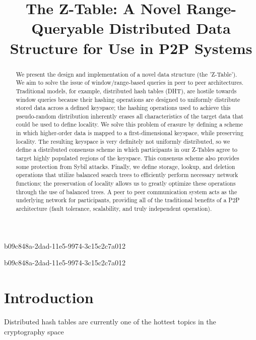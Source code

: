 \documentclass[12pt]{article}
\title{The Z-Table: A Novel Range-Queryable Distributed Data Structure for Use in P2P Systems}
\begin{document}
b09c848a-2dad-11e5-9974-3c15c2c7a012
\maketitle

\begin{abstract}
We present the design and implementation of a novel data structure (the 'Z-Table'). We aim to solve the issue of window/range-based queries in peer to peer architectures. Traditional models, for example,  distributed hash tables (DHT), are hostile towards window queries because their hashing operations are designed to uniformly distribute stored data across a defined keyspace; the hashing operations used to achieve this pseudo-random distribution inherently erases all characteristics of the target data that could be used to define locality. We solve this problem of erasure by defining a scheme in which higher-order data is mapped to a first-dimensional keyspace, while preserving locality. The resulting keyspace is very definitely not uniformly distributed, so we define a distributed consensus scheme in which participants in our Z-Tables agree to target highly populated regions of the keyspace. This consensus scheme also provides some protection from Sybil attacks. Finally, we define storage, lookup, and deletion operations that utilize balanced search trees to efficiently perform necessary network functions; the preservation of locality allows us to greatly optimize these operations through the use of balanced trees. A peer to peer communication system acts as the underlying network for participants, providing all of the traditional benefits of a P2P architecture (fault tolerance, scalability, and truly independent operation).
\end{abstract}
b09c848a-2dad-11e5-9974-3c15c2c7a012

\newpage
\section{Introduction}
Distributed hash tables are currently one of the hottest topics in the cryptography space~\cite{Stoica:2001dj,Rowstron:2001ea,Ratnasamy:2001wn}

\printbibliography
\end{document}
